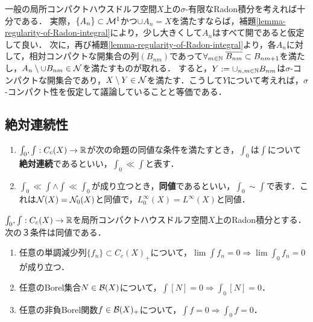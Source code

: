 \documentclass[uplatex,dvipdfmx]{jsreport}
\begin{document}
\begin{remark}
    一般の局所コンパクトハウスドルフ空間$X$上の$\sigma$-有限なRadon積分を考えれば十分である．
    実際，$\{A_n\}\subset\mathcal{M}^1$かつ$\cup A_n=X$を満たすならば，補題\ref{lemma-regularity-of-Radon-integral}により，少し大きくして$A_n$はすべて開であると仮定して良い．
    次に，再び補題\ref{lemma-regularity-of-Radon-integral}より，各$A_n$に対して，相対コンパクトな開集合の列$(B_{nm})$であって$\forall_{m\in\mathbb{N}}\;\overline{B_{nm}}\subset B_{nm+1}$を満たし，$A_n\setminus\cup B_{nm}\in\mathcal{N}$を満たすものが取れる．
    すると，$Y:=\cup_{n,m\in\mathbb{N}}B_{nm}$は$\sigma$-コンパクトな開集合であり，$X\setminus Y\in\mathcal{N}$を満たす．こうして$Y$について考えれば，$\sigma$-コンパクト性を仮定して議論していることと等価である．
\end{remark}

\subsection{絶対連続性}

\begin{definition}\mbox{}
    \begin{enumerate}
        \item $\int_0,\int:C_c(X)\to\mathbb{R}$が次の命題の同値な条件を満たすとき，$\int_0$は$\int$について\textbf{絶対連続}であるといい，$\int_0\ll\int$と表す．
        \item $\int_0\ll\int\land\int\ll\int_0$が成り立つとき，\textbf{同値}であるといい，$\int_0\sim\int$で表す．これは$\mathcal{N}(X)=\mathcal{N}_0(X)$と同値で，$L^\infty_0(X)=L^\infty(X)$と同値．
    \end{enumerate}
\end{definition}

\begin{proposition}
    $\int_0,\int:C_c(X)\to\mathbb{R}$を局所コンパクトハウスドルフ空間$X$上のRadon積分とする．次の３条件は同値である．
    \begin{enumerate}
        \item 任意の単調減少列$\{f_n\}\subset C_c(X)_+$について，$\lim\int f_n=0\Rightarrow\lim\int_0f_n=0$が成り立つ．
        \item 任意のBorel集合$N\in\mathcal{B}(X)$について，$\int[N]=0\Rightarrow\int_0[N]=0$．
        \item 任意の非負Borel関数$f\in\mathcal{B}(X)_+$について，$\int f=0\Rightarrow\int_0f=0$．
    \end{enumerate}
\end{proposition}
\end{document}
